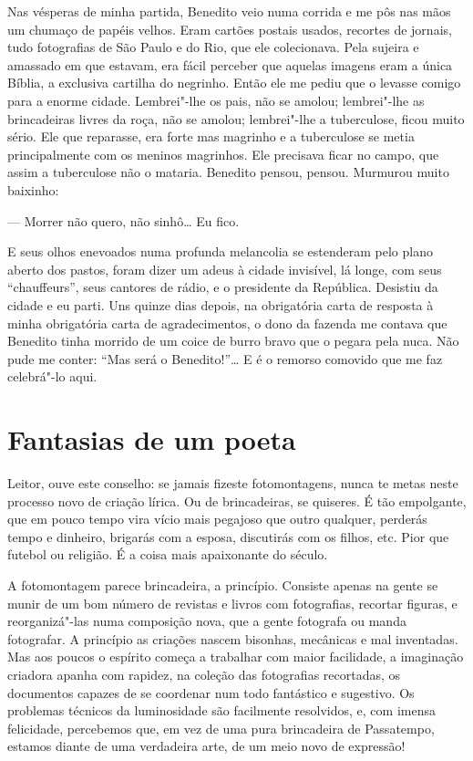 Nas vésperas de minha partida, Benedito veio numa corrida e me pôs nas
mãos um chumaço de papéis velhos. Eram cartões postais usados, recortes
de jornais, tudo fotografias de São Paulo e do Rio, que ele colecionava.
Pela sujeira e amassado em que estavam, era fácil perceber que aquelas
imagens eram a única Bíblia, a exclusiva cartilha do negrinho. Então ele
me pediu que o levasse comigo para a enorme cidade. Lembrei"-lhe os pais,
não se amolou; lembrei"-lhe as brincadeiras livres da roça, não se
amolou; lembrei"-lhe a tuberculose, ficou muito sério. Ele que reparasse,
era forte mas magrinho e a tuberculose se metia principalmente com os
meninos magrinhos. Ele precisava ficar no campo, que assim a tuberculose
não o mataria. Benedito pensou, pensou. Murmurou muito baixinho:

--- Morrer não quero, não sinhô\ldots{} Eu fico.

E seus olhos enevoados numa profunda melancolia se estenderam pelo plano
aberto dos pastos, foram dizer um adeus à cidade invisível, lá longe,
com seus ``chauffeurs'', seus cantores de rádio, e o presidente da
República. Desistiu da cidade e eu parti. Uns quinze dias depois, na
obrigatória carta de resposta à minha obrigatória carta de
agradecimentos, o dono da fazenda me contava que Benedito tinha morrido
de um coice de burro bravo que o pegara pela nuca. Não pude me conter:
``Mas será o Benedito!''\ldots{} E é o remorso comovido que me faz celebrá"-lo
aqui.

\chapter{Fantasias de um poeta}

Leitor, ouve este conselho: se jamais fizeste fotomontagens, nunca te
metas neste processo novo de criação lírica. Ou de brincadeiras, se
quiseres. É tão empolgante, que em pouco tempo vira vício mais pegajoso
que outro qualquer, perderás tempo e dinheiro, brigarás com a esposa,
discutirás com os filhos, etc. Pior que futebol ou religião. É a coisa
mais apaixonante do século.

A fotomontagem parece brincadeira, a princípio. Consiste apenas na gente
se munir de um bom número de revistas e livros com fotografias, recortar
figuras, e reorganizá"-las numa composição nova, que a gente fotografa ou
manda fotografar. A princípio as criações nascem bisonhas, mecânicas e
mal inventadas. Mas aos poucos o espírito começa a trabalhar com maior
facilidade, a imaginação criadora apanha com rapidez, na coleção das
fotografias recortadas, os documentos capazes de se coordenar num todo
fantástico e sugestivo. Os problemas técnicos da luminosidade são
facilmente resolvidos, e, com imensa felicidade, percebemos que, em vez
de uma pura brincadeira de Passatempo, estamos diante de uma verdadeira
arte, de um meio novo de expressão!

